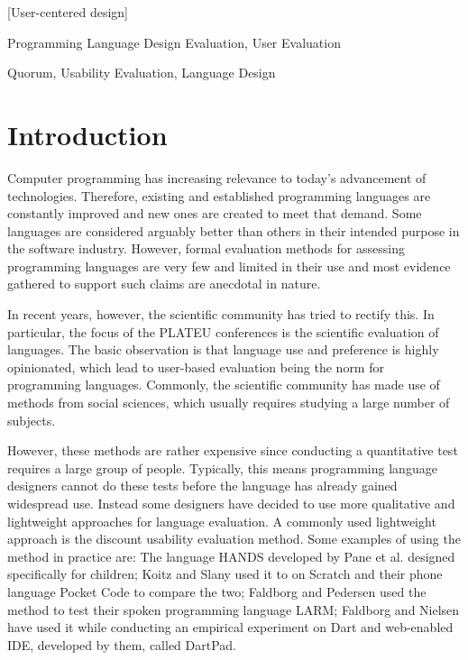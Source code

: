\documentclass[preprint,10pt]{sigplanconf}
\begin{document}
[User-centered design]

\terms
Programming Language Design Evaluation, User Evaluation

\keywords
Quorum, Usability Evaluation, Language Design

\section{Introduction}
Computer programming has increasing relevance to today's advancement of technologies. Therefore, existing and established programming languages are constantly improved and new ones are created to meet that demand. Some languages are considered arguably better than others in their intended purpose in the software industry. However, formal evaluation methods for assessing programming languages are very few and limited in their use and most evidence gathered to support such claims are anecdotal in nature\cite{StakingClaims}. 

In recent years, however, the scientific community has tried to rectify this.
In particular, the focus of the PLATEU conferences is the scientific evaluation of languages.
The basic observation is that language use and preference is highly opinionated, which lead to user-based evaluation being the norm for programming languages.
Commonly, the scientific community has made use of methods from social sciences, which usually requires studying a large number of subjects\cite{SocioPLT}\cite{AliceCS1}\cite{BlockOrNot}\cite{FromScratch}.

However, these methods are rather expensive since conducting a quantitative test requires a large group of people. Typically, this means programming language designers cannot do these tests before the language has already gained widespread use. Instead some designers have decided to use more qualitative and lightweight approaches for language evaluation. A commonly used lightweight approach is the discount usability evaluation method. Some examples of using the method in practice are: The language HANDS developed by Pane et al. designed specifically for children; Koitz and Slany used it to on Scratch and their phone language Pocket Code to compare the two; Faldborg and Pedersen used the method to test their spoken programming language LARM;  Faldborg and Nielsen have used it while conducting an empirical experiment on Dart and web-enabled IDE, developed by them, called DartPad.
\end{document}
